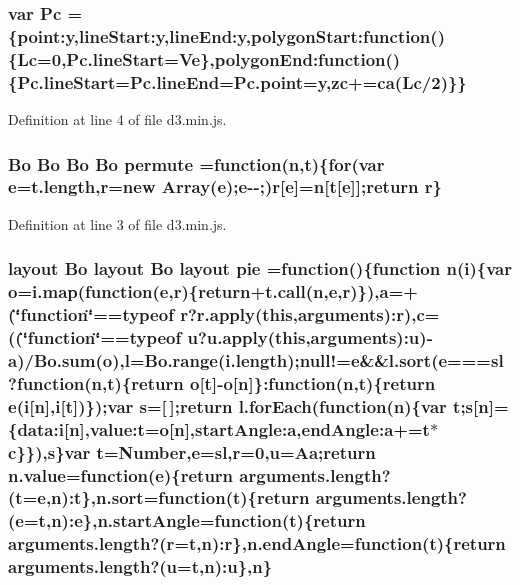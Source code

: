 \subsubsection[{Pc}]{\setlength{\rightskip}{0pt plus 5cm}var Pc =\{point\+:y,line\+Start\+:y,line\+End\+:y,polygon\+Start\+:function()\{{\bf Lc}=0,Pc.\+line\+Start=Ve\},polygon\+End\+:function()\{Pc.\+line\+Start=Pc.\+line\+End=Pc.\+point=y,{\bf zc}+={\bf ca}({\bf Lc}/2)\}\}}\label{d3_8min_8js_a3a0a9da711faf0c26837d2f8e7a4a0bd}


Definition at line 4 of file d3.\+min.\+js.

\subsubsection[{permute}]{ {\bf Bo} {\bf Bo} {\bf Bo} {\bf Bo} permute =function({\bf n},t)\{{\bf for}(var {\bf e}=t.\+length,{\bf r}=new Array({\bf e});{\bf e}-\/-\/;){\bf r}[{\bf e}]={\bf n}[t[{\bf e}]];{\bf return} {\bf r}\}}\label{d3_8min_8js_a150ba38c34f6382984bb527e471db28b}


Definition at line 3 of file d3.\+min.\+js.

\subsubsection[{pie}]{ {\bf layout} {\bf Bo} {\bf layout} {\bf Bo} {\bf layout} pie =function()\{function {\bf n}({\bf i})\{var {\bf o}={\bf i.\+map}(function({\bf e},{\bf r})\{{\bf return}+{\bf t.\+call}({\bf n},{\bf e},{\bf r})\}),{\bf a}=+(\char`\"{}function\char`\"{}==typeof {\bf r}?r.\+apply({\bf this},arguments)\+:{\bf r}),{\bf c}=((\char`\"{}function\char`\"{}==typeof u?u.\+apply({\bf this},arguments)\+:u)-\/{\bf a})/{\bf Bo.\+sum}({\bf o}),l={\bf Bo.\+range}(i.\+length);null!={\bf e}\&\&{\bf l.\+sort}({\bf e}==={\bf sl}?function({\bf n},t)\{{\bf return} {\bf o}[t]-\/{\bf o}[{\bf n}]\}\+:function({\bf n},t)\{{\bf return} {\bf e}({\bf i}[{\bf n}],{\bf i}[t])\});var s=[$\,$];{\bf return} {\bf l.\+for\+Each}(function({\bf n})\{var t;s[{\bf n}]=\{data\+:i[{\bf n}],value\+:t={\bf o}[{\bf n}],start\+Angle\+:a,end\+Angle\+:a+=t$\ast${\bf c}\}\}),s\}var t=Number,{\bf e}={\bf sl},{\bf r}=0,u={\bf Aa};{\bf return} n.\+value=function({\bf e})\{{\bf return} arguments.\+length?(t={\bf e},{\bf n})\+:t\},{\bf n.\+sort}=function(t)\{{\bf return} arguments.\+length?({\bf e}=t,{\bf n})\+:{\bf e}\},n.\+start\+Angle=function(t)\{{\bf return} arguments.\+length?({\bf r}=t,{\bf n})\+:{\bf r}\},n.\+end\+Angle=function(t)\{{\bf return} arguments.\+length?(u=t,{\bf n})\+:u\},{\bf n}\}}\label{d3_8min_8js_a40a8e531f0034c162c9659f1e2af0915}


